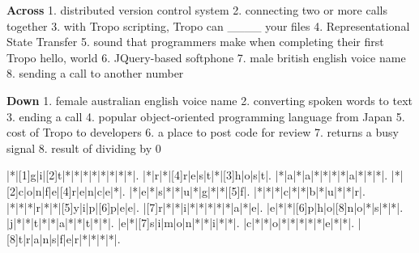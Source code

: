 \documentclass[custom, plainsections]{sciposter}
\begin{document}
\begin{multicols*}{3}
\vspace{0.4cm}

\textbf{Across}
1. distributed version control system
2. connecting two or more calls together
3. with Tropo scripting, Tropo can \_\_\_\_ your files
4. Representational State Transfer
5. sound that programmers make when completing their first Tropo hello, world
6. JQuery-based softphone
7. male british english voice name
8. sending a call to another number

\vspace{0.4cm}

\textbf{Down}
1. female australian english voice name
2. converting spoken words to text
3. ending a call
4. popular object-oriented programming language from Japan
5. cost of Tropo to developers
6. a place to post code for review
7. returns a busy signal
8. result of dividing by 0

\vspace{1.5cm}

\begin{Puzzle}{12}{13}%
|*|[1]g|i|[2]t|*|*|*|*|*|*|*|*|.
|*|r|*|[4]r|e|s|t|*|[3]h|o|s|t|.
|*|a|*|a|*|*|*|*|a|*|*|*|.
|*|[2]c|o|n|f|e|[4]r|e|n|c|e|*|.
|*|e|*|s|*|*|u|*|g|*|*|[5]f|.
|*|*|*|c|*|*|b|*|u|*|*|r|.
|*|*|*|r|*|*|[5]y|i|p|[6]p|e|e|.
|[7]r|*|*|i|*|*|*|*|*|a|*|e|.
|e|*|*|[6]p|h|o|[8]n|o|*|s|*|*|.
|j|*|*|t|*|*|a|*|*|t|*|*|.
|e|*|[7]s|i|m|o|n|*|*|i|*|*|.
|c|*|*|o|*|*|*|*|*|e|*|*|.
|[8]t|r|a|n|s|f|e|r|*|*|*|*|.
\end{Puzzle}

\end{multicols*}

\pagebreak
\end{document}
